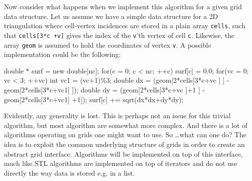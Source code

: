   Now consider what happens when we implement this algorithm for a given grid data structure.
  Let us assume we have a simple data structure for a 2D triangulation
  where cell-vertex incidences are stored in a plain array \texttt{cells},
  such that \texttt{cells[3*c +v]} gives the index of the \texttt{v}'th vertex
  of cell \texttt{c}. Likewise, the array \texttt{geom} is assumed to 
  hold the coordinates of vertex \texttt{v}.
  A possible implementation could be the following:
  \begin{example}  
   double * surf = new double[nc];
   for(c = 0; c < nc; ++c) {
     surf[c] = 0.0;
     for(vc = 0; vc < 3; ++vc) {
       int vc1 = (vc+1)\%3;
       double dx = (geom[2*cells[3*c+vc ]   ] - geom[2*cells[3*c+vc1]   ]);
       double dy = (geom[2*cells[3*c+vc ]+1 ] - geom[2*cells[3*c+vc1] +1]);
       surf[c] +=  sqrt(dx*dx+dy*dy);
     }
   }
  \end{example}
  
  Evidently, any generality is lost. 
  This is perhaps not an issue for this trivial algorithm, 
  but most algorithm are somewhat more complex.
  And there is a lot of algorithms operating on grids 
  one might want to use.
  So \ldots what can one do? 
  The idea is to exploit the common underlying structure of grids
  in order to create an abstract grid interface.
  Algorithms will be implemented on top of this interface,
  much like STL algorithms are implemented on top of iterators
  and do not use directly the way data is stored e.g. in a list.

